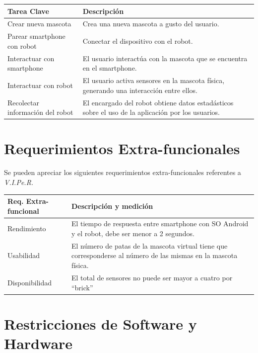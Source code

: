 \documentclass[letterpaper,12pt]{article} %
\numberwithin{equation}{section} %
\numberwithin{figure}{section} %
\numberwithin{table}{section} %
\begin{document}
\begin{table}[H]
  \centering
  \begin{tabular}{p{5cm}p{9cm}}\hline
    Tarea Clave & Descripci\'on \\ \hline\hline %
    Crear nueva mascota & Crea una nueva mascota a gusto del usuario. \\ \hline
    Parear smartphone con robot & Conectar el dispositivo con el robot. \\ \hline
    Interactuar con smartphone & El usuario interact\'ua con la mascota que se encuentra en el smartphone. \\ \hline
    Interactuar con robot & El usuario activa sensores en la mascota f\'isica, generando una interacci\'on entre ellos. \\ \hline
    Recolectar informaci\'on del robot & El encargado del robot obtiene datos estad\'asticos sobre el uso de la aplicaci\'on por los usuarios. \\ \hline\hline
  \end{tabular}
\end{table}

\newpage
\section{Requerimientos Extra-funcionales}

Se pueden apreciar los siguientes requerimientos extra-funcionales referentes a \emph{V.I.Pe.R.}

\begin{table}[H]
  \centering
  \begin{tabular}{p{5cm}p{9cm}}\hline 
    Req. Extra-funcional & Descripci\'on y medici\'on \\ \hline\hline %
    Rendimiento & El tiempo de respuesta entre smartphone con SO Android y el robot, debe ser menor a 2 segundos.\\\hline
    Usabilidad & El n\'umero de patas de la mascota virtual tiene que corresponderse al n\'umero de las mismas en la mascota f\'isica.\\ \hline
    Disponibilidad & El total de sensores no puede ser mayor a cuatro por ``brick''\\\hline \hline
  \end{tabular}
\end{table}

\newpage
\section{Restricciones de Software y Hardware}
\end{document}

